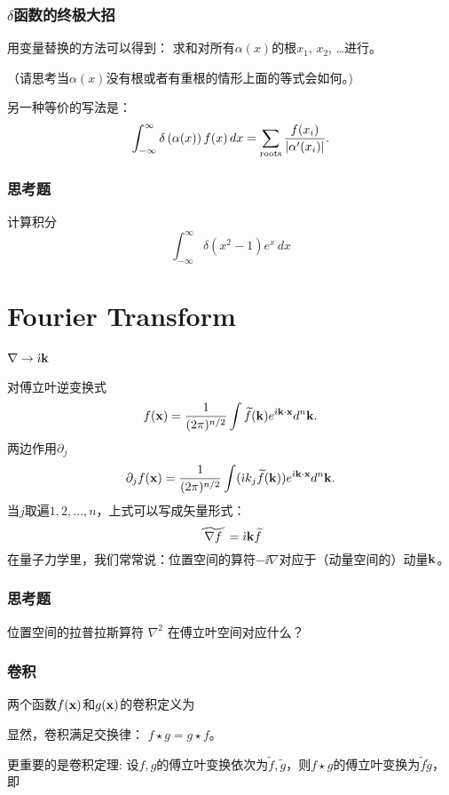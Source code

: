 \documentclass[CJK]{beamer}
\begin{document}
\begin{frame}
  \frametitle{$\delta$函数的终极大招}
  
  用变量替换的方法可以得到：
  求和对所有$\alpha(x)$的根$x_1$, $x_2$, \ldots 进行。

   {\scriptsize （请思考当$\alpha(x)$没有根或者有重根的情形上面的等式会如何。)}

  \skiplines
  
 {\small 另一种等价的写法是：
  $$\int_{-\infty}^\infty \delta\left(\alpha(x)\right) f(x) \,dx = \sum_{\rm roots} \frac{f(x_i)}{|\alpha'(x_i)|}.$$}
  
  
\end{frame}


\begin{frame}
  \frametitle{思考题}
  计算积分
  $$\int_{-\infty}^\infty \delta(x^2-1) e^x\, dx$$
\end{frame}




\section{Fourier Transform}

\begin{frame}
  \frametitle{$\nabla \rightarrow {\dot{\imath}} {\mathbf{k}}$}
  
  对傅立叶逆变换式
  $$ f({\mathbf{x}}) = \frac{1}{(2\pi)^{n/2}}\int \widetilde{f}({\mathbf{k}}) e^{{\dot{\imath}} {\mathbf{k}} \cdot {\mathbf{x}}} d^n{\mathbf{k}}. $$
  两边作用$\partial_j$
  $$ \partial_j f({\mathbf{x}}) =  \frac{1}{(2\pi)^{n/2}}\int ({\dot{\imath}} k_j \widetilde{f}({\mathbf{k}})) e^{{\dot{\imath}} {\mathbf{k}} \cdot {\mathbf{x}}} d^n{\mathbf{k}}. $$
  当$j$取遍$1,2,\ldots, n$，上式可以写成矢量形式：
  {\blue  $$ \widetilde{\ \nabla f\ } = {\dot{\imath}} {\mathbf{k}} \widetilde{f} $$}
  在量子力学里，我们常常说：位置空间的算符$-\ii\nabla$对应于（动量空间的）动量${\mathbf{k}}$。
\end{frame}


\begin{frame}
  \frametitle{思考题}
      位置空间的拉普拉斯算符 $\nabla^2$ 在傅立叶空间对应什么？

\end{frame}


\begin{frame}
  \frametitle{卷积}
  
  
  两个函数$f({\mathbf{x}})$和$g({\mathbf{x}})$的卷积定义为

  显然，卷积满足交换律： {\blue $f\star g = g\star f$}。

  更重要的是卷积定理: 设$f,g$的傅立叶变换依次为$\widetilde{f},\widetilde{g}$，则$f\star g$的傅立叶变换为$\widetilde{f}\widetilde{g}$，即
  
 \end{frame}
\end{document}
